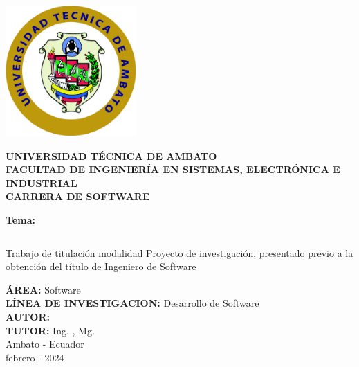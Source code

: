 \begin{titlepage}
	\begin{center}

		\includegraphics[width=50mm]{resources/images/logo-uta.png}

		\textbf{\uppercase{
				Universidad Técnica de Ambato \\
				\vspace{5mm}
				Facultad de Ingeniería en sistemas, electrónica e industrial \\
				\vspace{5mm}
				carrera de software \\
			}}

		\vspace{5mm}
		\textbf{Tema:}
		\vspace{5mm}

		\begin{tabular}[c]{>{\centering\arraybackslash}p{}}
			\toprule
			{\bfseries\MakeUppercase\tema} \\
			\bottomrule
		\end{tabular}

    \vspace{24pt}
		Trabajo de titulación modalidad Proyecto de investigación, presentado
		previo a la obtención del título de Ingeniero de Software

		\vspace{5mm}
		\textbf{\uppercase{área:}} Software\\
		\vspace{5mm}
		\textbf{\uppercase{línea de investigacion:}} Desarrollo de Software\\
		\vspace{5mm}
		\textbf{\uppercase{autor:}} \autor \\
		\vspace{5mm}
		\textbf{\uppercase{tutor:}} Ing. \tutor, Mg.\\

		\vfill
		Ambato - Ecuador\\
		febrero - 2024

	\end{center}
\end{titlepage}
